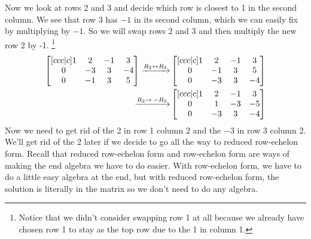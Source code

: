 \documentclass[12pt]{scrartcl}
\begin{document}
Now we look at rows 2 and 3 and decide which row is closest to 1 in the second column. We see that row 3 has $-1$ in its second column, which we can easily fix by multiplying by $-1.$ So we will swap rows 2 and 3 and then multiply the new row 2 by -1.
\footnote{Notice that we didn't consider swapping row 1 at all because we already have chosen row 1 to stay as the top row due to the 1 in column 1.}
\begin{align*}
    \begin{bmatrix}[ccc|c]
        1 & 2 & -1 & 3 \\
        0 & -3 & 3 & -4 \\
        0 & -1 & 3 & 5
    \end{bmatrix}
    \xto[R_2 \lrto R_3]&
    \begin{bmatrix}[ccc|c]
        1 & 2 & -1 & 3 \\
        0 & -1 & 3 & 5 \\
        0 & -3 & 3 & -4
    \end{bmatrix} \\
    \xto[R_2 \to \: -R_2]&
    \begin{bmatrix}[ccc|c]
        1 & 2 & -1 & 3 \\
        0 & 1 & -3 & -5 \\
        0 & -3 & 3 & -4
    \end{bmatrix}
\end{align*}
Now we need to get rid of the 2 in row 1 column 2 and the $-3$ in row 3 column 2. We'll get rid of the 2 later if we decide to go all the way to reduced row-echelon form. Recall that reduced row-echelon form and row-echelon form are ways of making the end algebra we have to do easier. With row-echelon form, we have to do a little easy algebra at the end, but with reduced row-echelon form, the solution is literally in the matrix so we don't need to do any algebra.
\end{document}
